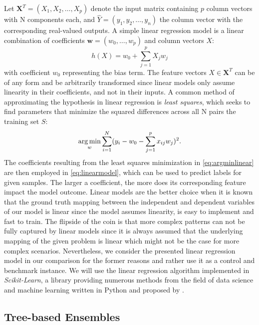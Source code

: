 Let $ \textbf{X}^{T} = (X_1, X_2, \dots, X_p) $ denote the input matrix containing $ p $ column vectors with N components each, and $ \hat{Y} = (y_1, y_2, \dots, y_n)$ the column vector with the corresponding real-valued outputs. A simple linear regression model is a linear combination of coefficients $ \mathbf{w} = (w_0, \dots, w_p) $ and column vectors $ X $:
\begin{equation}\label{eq:linearmodel}
h(X) = w_0 + \sum_{j=1}^{p} X_jw_j
\end{equation}
with coefficient $ w_0 $ representing the bias term. The feature vectors $ X \in \textbf{X}^{T} $ can be of any form and be arbitrarily transformed since linear models only assume linearity in their coefficients, and not in their inputs.
A common method of approximating the hypothesis in linear regression is \textit{least squares}, which seeks to find parameters that minimize the squared differences across all N pairs the training set $ S $:
\begin{equation}\label{eq:argminlinear}
\operatorname*{arg\,min}_{w} \sum_{i=1}^{N}(y_i - w_0 - \sum_{j=1}^{p} x_{ij}w_j)^2. 
\end{equation}
The coefficients resulting from the least squares minimization in \ref{eq:argminlinear} are then employed in \ref{eq:linearmodel}, which can be used to predict labels for given samples. The larger a coefficient, the more does its corresponding feature impact the model outcome. 
Linear models are the better choice when it is known that the ground truth mapping between the independent and dependent variables of our model is linear since the model assumes linearity, is easy to implement and fast to train. The flipside of the coin is that more complex patterns can not be fully captured by linear models since it is always assumed that the underlying mapping of the given problem is linear which might not be the case for more complex scenarios. Nevertheless, we consider the presented linear regression model in our comparison for the former reasons and rather use it as a control and benchmark instance.
We will use the linear regression algorithm implemented in \textit{Scikit-Learn}, a library providing numerous methods from the field of data science and machine learning written in Python and proposed by \cite{scikit-learn}.

\subsection{Tree-based Ensembles}

